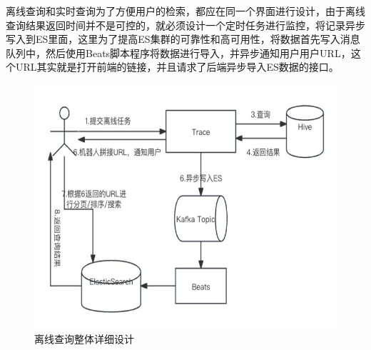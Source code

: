 离线查询和实时查询为了方便用户的检索，都应在同一个界面进行设计，由于离线查询结果返回时间并不是可控的，就必须设计一个定时任务进行监控，将记录异步写入到ES里面，这里为了提高ES集群的可靠性和高可用性，将数据首先写入消息队列中，然后使用Beats脚本程序将数据进行导入，并异步通知用户用户URL，这个URL其实就是打开前端的链接，并且请求了后端异步导入ES数据的接口。
   \begin{figure}[htb]
  \centering
  \includegraphics[width=5in]{figure/chapter4/离线查询整体详细设计.jpg}
  \caption{离线查询整体详细设计}\label{lixianzhengti}
\end{figure}

